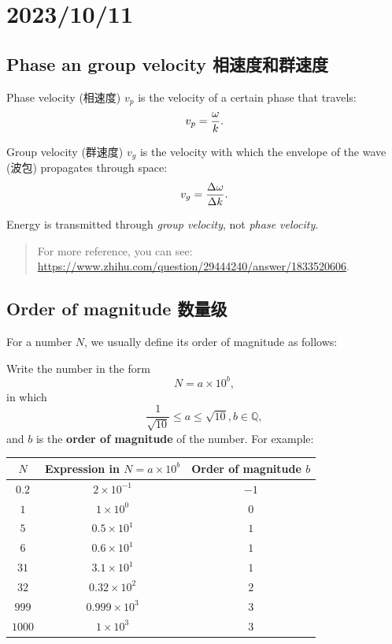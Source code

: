 \chapter{2023/10/11}\label{20231011}

\section{Phase an group velocity
相速度和群速度}\label{phase-an-group-velocity-ux76f8ux901fux5ea6ux548cux7fa4ux901fux5ea6}

Phase velocity (相速度) \(v_p\) is the velocity of a certain phase that
travels: \[v_p = {\omega \over k}.\]

Group velocity (群速度) \(v_g\) is the velocity with which the envelope
of the wave (波包) propagates through space:
\[v_g = {\Delta \omega \over \Delta k}.\]

Energy is transmitted through \emph{group velocity}, not \emph{phase
velocity}.

\begin{quote}
For more reference, you can see:
\url{https://www.zhihu.com/question/29444240/answer/1833520606}.
\end{quote}

\section{Order of magnitude
数量级}\label{order-of-magnitude-ux6570ux91cfux7ea7}

For a number \(N\), we usually define its order of magnitude as follows:

Write the number in the form \[N =a \times 10 ^ b,\] in which
\[\dfrac{1}{\sqrt{10}} \leq a \leq \sqrt{10}, b \in \mathbb{Q},\] and
\(b\) is the \textbf{order of magnitude} of the number. For example:

\begin{center}
    \begin{tabular}{|c|c|c|}
        \hline
        $N$ & Expression in $N =a \times 10^b$ & Order of magnitude $b$ \\
        \hline
        $0.2$ & $2 \times 10^{-1}$ & $-1$ \\
        $1$ & $1 \times 10^{0}$ & $0$ \\
        $5$ & $0.5 \times 10^{1}$ & $1$ \\
        $6$ & $0.6 \times 10^{1}$ & $1$ \\
        $31$ & $3.1 \times 10^{1}$ & $1$ \\
        $32$ & $0.32 \times 10^{2}$ & $2$ \\
        $999$ & $0.999 \times 10^{3}$ & $3$ \\
        $1000$ & $1 \times 10^{3}$ & $3$ \\
        \hline
    \end{tabular}
\end{center}

